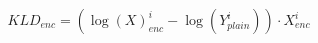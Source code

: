 \begin{equation}
        KLD_{enc} = ( \log(X)_{enc}^i - \log(Y_{plain}^i) ) \cdot X_{enc}^i
    \label{eq:fhe_kld_enc}
\end{equation}